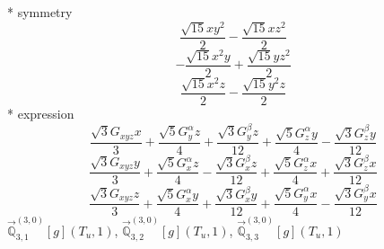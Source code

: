 \documentclass[fleqn,8pt]{jsarticle}
\begin{document}
\noindent\quad ** symmetry
\begin{dmath*}
\frac{\sqrt{15} x y^{2}}{2} - \frac{\sqrt{15} x z^{2}}{2}
\end{dmath*}
\begin{dmath*}
- \frac{\sqrt{15} x^{2} y}{2} + \frac{\sqrt{15} y z^{2}}{2}
\end{dmath*}
\begin{dmath*}
\frac{\sqrt{15} x^{2} z}{2} - \frac{\sqrt{15} y^{2} z}{2}
\end{dmath*}
\noindent\quad ** expression
\begin{dmath*}
\frac{\sqrt{3} G_{xyz} x}{3} + \frac{\sqrt{5} G_{y}^{\alpha} z}{4} + \frac{\sqrt{3} G_{y}^{\beta} z}{12} + \frac{\sqrt{5} G_{z}^{\alpha} y}{4} - \frac{\sqrt{3} G_{z}^{\beta} y}{12}
\end{dmath*}
\begin{dmath*}
\frac{\sqrt{3} G_{xyz} y}{3} + \frac{\sqrt{5} G_{x}^{\alpha} z}{4} - \frac{\sqrt{3} G_{x}^{\beta} z}{12} + \frac{\sqrt{5} G_{z}^{\alpha} x}{4} + \frac{\sqrt{3} G_{z}^{\beta} x}{12}
\end{dmath*}
\begin{dmath*}
\frac{\sqrt{3} G_{xyz} z}{3} + \frac{\sqrt{5} G_{x}^{\alpha} y}{4} + \frac{\sqrt{3} G_{x}^{\beta} y}{12} + \frac{\sqrt{5} G_{y}^{\alpha} x}{4} - \frac{\sqrt{3} G_{y}^{\beta} x}{12}
\end{dmath*}
\noindent\quad $\vec{\mathbb{Q}}_{3,1}^{(3,0)}[g](T_{u},1)$, $\vec{\mathbb{Q}}_{3,2}^{(3,0)}[g](T_{u},1)$, $\vec{\mathbb{Q}}_{3,3}^{(3,0)}[g](T_{u},1)$
\end{document}
